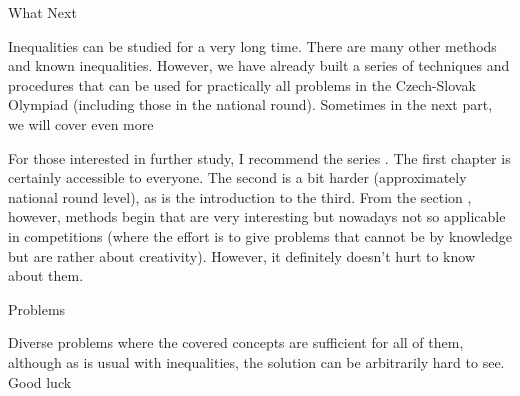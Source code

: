 \enditems 

\sec What Next

Inequalities can be studied for a very long time. There are many other methods and known inequalities. However, we have already built a series of techniques and procedures that can be used for practically all problems in the Czech-Slovak Olympiad (including those in the national round). Sometimes in the next part, we will cover even more \SlightSmile{}

For those interested in further study, I recommend the  series . The first chapter is certainly accessible to everyone. The second is a bit harder (approximately national round level), as is the introduction to the third. From the section , however, methods begin that are very interesting but nowadays not so applicable in competitions (where the effort is to give problems that cannot be  by knowledge but are rather about creativity). However, it definitely doesn't hurt to know about them.

\sec Problems

Diverse problems where the covered concepts are sufficient for all of them, although as is usual with inequalities, the solution can be arbitrarily hard to see. Good luck \SlightSmile{}

